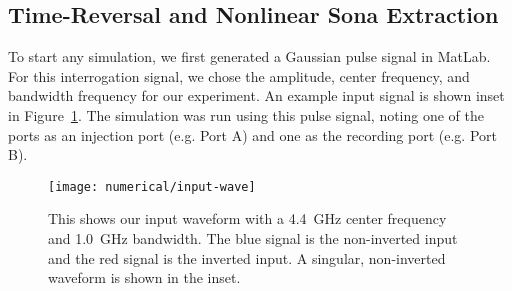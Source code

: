 \subsection{Time-Reversal and Nonlinear Sona Extraction}
To start any simulation, we first generated a Gaussian pulse signal in MatLab. For this interrogation signal, we chose the amplitude, center frequency, and bandwidth frequency for our experiment. An example input signal is shown inset in Figure~\ref{fig:numerical-input-wave}. The simulation was run using this pulse signal, noting one of the ports as an injection port (e.g. Port A) and one as the recording port (e.g. Port B).


\begin{figure}[t]
\centering
\texttt{[image: numerical/input-wave]}
\caption[Example of inverted and non-inverted interrogation signals]{This shows our input waveform with a 4.4~GHz center frequency and 1.0~GHz bandwidth. The blue signal is the non-inverted input and the red signal is the inverted input. A singular, non-inverted waveform is shown in the inset.}
\label{fig:numerical-input-wave}
\end{figure}

